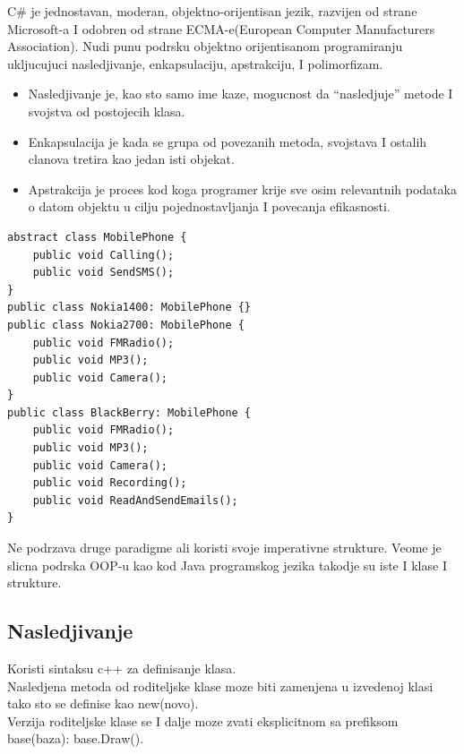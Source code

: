 \documentclass[a4paper]{article}
\begin{document}
C\# je jednostavan, moderan, objektno-orijentisan jezik, razvijen od strane Microsoft-a I  odobren od strane ECMA-e(European Computer Manufacturers Association).  Nudi punu podrsku objektno orijentisanom programiranju ukljucujuci nasledjivanje, enkapsulaciju, apstrakciju, I polimorfizam.

\begin{itemize}
  \item Nasledjivanje je, kao sto samo ime kaze, mogucnost da “nasledjuje” metode I svojstva od postojecih klasa.
  \item Enkapsulacija je kada se grupa od povezanih metoda, svojstava I ostalih clanova tretira kao jedan isti objekat.
  \item Apstrakcija je proces kod koga programer krije sve osim relevantnih podataka o datom objektu u cilju pojednostavljanja I povecanja efikasnosti.
\end{itemize}

\begin{lstlisting}[caption={Primer deklarisanja apstraktivne klase u C\#-u},frame=single, label=lst:csharpDeklaracija]
abstract class MobilePhone {  
    public void Calling();  
    public void SendSMS();  
}  
public class Nokia1400: MobilePhone {}  
public class Nokia2700: MobilePhone {  
    public void FMRadio();  
    public void MP3();  
    public void Camera();  
}  
public class BlackBerry: MobilePhone {  
    public void FMRadio();  
    public void MP3();  
    public void Camera();  
    public void Recording();  
    public void ReadAndSendEmails();  
} 
\end{lstlisting}

Ne podrzava druge paradigme ali koristi svoje imperativne strukture. Veome je slicna podrska OOP-u kao kod Java programskog jezika takodje su iste I klase I strukture.\\

\subsection{Nasledjivanje}
\label{subsec:csharpNasledjivanje}

Koristi sintaksu c++ za definisanje klasa.\\
Nasledjena metoda od roditeljske klase moze biti zamenjena u izvedenoj klasi tako sto se definise kao new(novo).\\
Verzija roditeljske klase se I dalje moze zvati eksplicitnom sa prefiksom base(baza): base.Draw().\\
\end{document}
